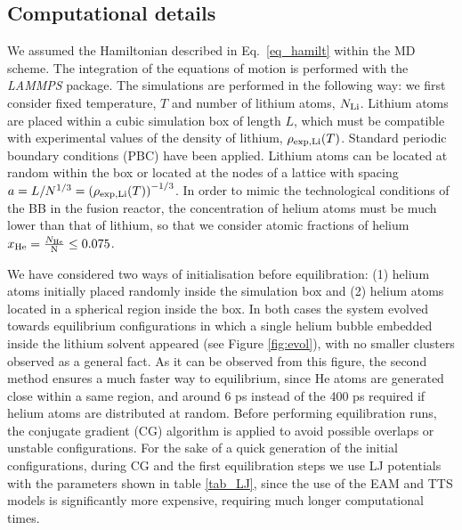 \documentclass[jcp,amsmath,amssymb,preprint]{revtex4-1}
\begin{document}
\subsection*{\label{cd} Computational details}
        
We assumed the Hamiltonian described in Eq.~\ref{eq_hamilt} within the MD scheme. The integration of the equations of motion is performed with the \textit{LAMMPS} package\cite{LAMMPS}.  The simulations are performed in the following way: we first consider fixed temperature, $T$ and number of lithium atoms, $N_{\rm Li}$.  Lithium atoms are placed within a cubic simulation box of length $L$, which must be compatible with experimental values of the density of lithium, $\rho_{\rm exp, Li} (T)$\cite{zinkle1998summary,davison1968compilation}. Standard periodic boundary conditions (PBC) have been applied.  Lithium atoms can be located at random within the box or located at the nodes of a lattice with spacing $a = L / N^{1/3} = \left( \rho_{\rm exp, Li}(T)\right)^{-1/3}$.  In order to mimic the technological conditions of the BB in the fusion reactor,  the concentration of helium atoms must be much lower than that of lithium, so that we consider atomic fractions of helium $x_{\rm He}=\frac{N_{\rm He}}{{\rm N}}\leq 0.075$. 

We have considered two ways of initialisation before equilibration: (1) helium atoms initially placed randomly inside the simulation box and (2) helium atoms located in a spherical region inside the box. In both cases the system evolved towards equilibrium configurations in which a single helium bubble embedded inside the lithium solvent appeared (see Figure \ref{fig:evol}), with no smaller clusters observed as a general fact.  As it can be observed from this figure, the second method ensures a much faster way to equilibrium, since He atoms are generated close within a same region, and around 6 ps instead of the 400 ps required if helium atoms are distributed at random.  Before performing equilibration runs, the conjugate gradient (CG) algorithm\cite{hestenes1952methods} is applied to avoid possible overlaps or unstable configurations.  For the sake of a quick generation of the initial configurations, during CG and the first equilibration steps we use LJ potentials with the parameters shown in table \ref{tab_LJ}, since the use of the EAM and TTS models is significantly more expensive,  requiring much longer computational times. 
\end{document}
